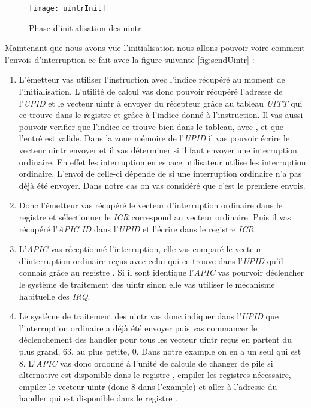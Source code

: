 \begin{figure}[H]
  \texttt{[image: uintrInit]}
  \caption{Phase d'initialisation des uintr}
  \label{fig:initUintr}
\end{figure}


Maintenant que nous avons vue l'initialisation nous allons pouvoir voire comment l'envois d'interruption ce fait avec la figure suivante \ref{fig:sendUintr} :

\begin{enumerate}[label=\protect\circled{\arabic*}]
  \item L'émetteur vas utiliser l'instruction  avec l'indice récupéré au moment de l'initialisation.
  L'utilité de calcul vas donc pouvoir récupéré l'adresse de l'\emph{UPID} et le vecteur uintr à envoyer du récepteur grâce au tableau \emph{UITT} qui ce trouve dans le registre  et grâce à l'indice donné à l'instruction.
  Il vas aussi pouvoir verifier que l'indice ce trouve bien dans le tableau, avec , et que l'entré est valide.
  Dans la zone mémoire de l'\emph{UPID} il vas pouvoir écrire le vecteur uintr envoyer et il vas déterminer si il faut envoyer une interruption ordinaire.
  En effet les interruption en espace utilisateur utilise les interruption ordinaire.
  L'envoi de celle-ci dépende de si une interruption ordinaire n'a pas déjà été envoyer.
  Dans notre cas on vas considéré que c'est le premiere envois.
  \item Donc l'émetteur vas récupéré le vecteur d'interruption ordinaire dans le registre  et sélectionner le \emph{ICR} correspond au vecteur ordinaire.
  Puis il vas récupéré l'\emph{APIC ID} dans l'\emph{UPID} et l'écrire dans le registre \emph{ICR}.
  \item L'\emph{APIC} vas réceptionné l'interruption, elle vas comparé le vecteur d'interruption ordinaire reçus avec celui qui ce trouve dans l'\emph{UPID} qu'il connais grâce au registre .
  Si il sont identique l'\emph{APIC} vas pourvoir déclencher le système de traitement des uintr sinon elle vas utiliser le mécanisme habituelle des \emph{IRQ}.
  \item Le système de traitement des uintr vas donc indiquer dans l'\emph{UPID} que l'interruption ordinaire a déjà été envoyer puis vas commancer le déclenchement des handler pour tous les vecteur uintr reçus en partent du plus grand, 63, au plus petite, 0. %
  Dans notre example on en a un seul qui est 8.
  L'\emph{APIC} vas donc ordonné à l'unité de calcule de changer de pile si alternative est disponible dans
  le registre , empiler les registres nécessaire, empiler le vecteur uintr (donc 8 dans l'example) et aller à l'adresse du handler qui est disponible dans le registre .
\end{enumerate}

